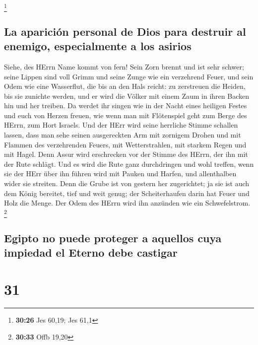 \footnote{\textbf{30:26} Jes 60,19; Jes 61,1}

\hypertarget{la-apariciuxf3n-personal-de-dios-para-destruir-al-enemigo-especialmente-a-los-asirios}{%
\subsection{La aparición personal de Dios para destruir al enemigo,
especialmente a los
asirios}\label{la-apariciuxf3n-personal-de-dios-para-destruir-al-enemigo-especialmente-a-los-asirios}}

 Siehe, des HErrn Name kommt von fern! Sein Zorn brennt
und ist sehr schwer; seine Lippen sind voll Grimm und seine Zunge wie
ein verzehrend Feuer,  und sein Odem wie eine Wasserflut,
die bis an den Hals reicht: zu zerstreuen die Heiden, bis sie zunichte
werden, und er wird die Völker mit einem Zaum in ihren Backen hin und
her treiben.  Da werdet ihr singen wie in der Nacht eines
heiligen Festes und euch von Herzen freuen, wie wenn man mit Flötenspiel
geht zum Berge des HErrn, zum Hort Israels.  Und der HErr
wird seine herrliche Stimme schallen lassen, dass man sehe seinen
ausgereckten Arm mit zornigem Drohen und mit Flammen des verzehrenden
Feuers, mit Wetterstrahlen, mit starkem Regen und mit Hagel.
 Denn Assur wird erschrecken vor der Stimme des HErrn,
der ihn mit der Rute schlägt.  Und es wird die Rute ganz
durchdringen und wohl treffen, wenn sie der HErr über ihn führen wird
mit Pauken und Harfen, und allenthalben wider sie streiten.
 Denn die Grube ist von gestern her zugerichtet; ja sie
ist auch dem König bereitet, tief und weit genug; der Scheiterhaufen
darin hat Feuer und Holz die Menge. Der Odem des HErrn wird ihn anzünden
wie ein Schwefelstrom. \footnote{\textbf{30:33} Offb 19,20}

\hypertarget{egipto-no-puede-proteger-a-aquellos-cuya-impiedad-el-eterno-debe-castigar}{%
\subsection{Egipto no puede proteger a aquellos cuya impiedad el Eterno
debe
castigar}\label{egipto-no-puede-proteger-a-aquellos-cuya-impiedad-el-eterno-debe-castigar}}

\hypertarget{section-30}{%
\section{31}\label{section-30}}

